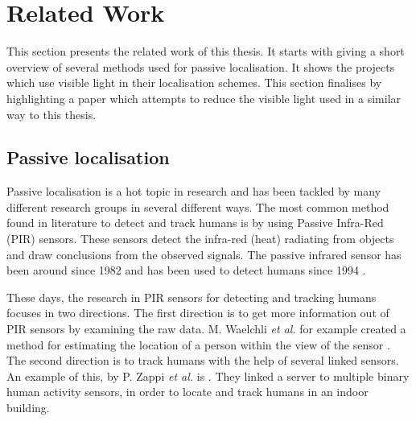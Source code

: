 \section{Related Work}
\label{sec:Related Work}
This section presents the related work of this thesis. It starts with giving a short overview of several methods used for passive localisation. It shows the projects which use visible light in their localisation schemes. This section finalises by highlighting a paper which attempts to reduce the visible light used in a similar way to this thesis.

\subsection{Passive localisation}
Passive localisation is a hot topic in research and has been tackled by many different research groups in several different ways. The most common method found in literature to detect and track humans is by using Passive Infra-Red (PIR) sensors. These sensors detect the infra-red (heat) radiating from objects and draw conclusions from the observed signals. The passive infrared sensor has been around since 1982 \cite{galvin1982passive} and has been used to detect humans since 1994 \cite{fukuda1994human}.

These days, the research in PIR sensors for detecting and tracking humans focuses in two directions. The first direction is to get more information out of PIR sensors by examining the raw data. M. Waelchli \textit{et al.} for example created a method for estimating the location of a person within the view of the sensor \cite{PIR_Single_Tracking}. The second direction is to track humans with the help of several linked sensors. An example of this, by P. Zappi \textit{et al.} is \cite{PIR_Tracking}. They linked a server to multiple binary human activity sensors, in order to locate and track humans in an indoor building.

